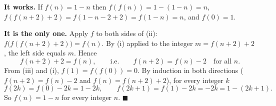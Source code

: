 \textbf{It works.} If $f(n)=1-n$ then $f(f(n))=1-(1-n)=n$, $f(f(n+2)+2)=f(1-n-2+2)=f(1-n)=n$, and $f(0)=1$.

\textbf{It is the only one.} Apply $f$ to both sides of (ii): $f\bigl(f(f(n+2)+2)\bigr)=f(n)$. By (i) applied to the integer $m=f(n+2)+2$, the left side equals $m$. Hence
\[f(n+2)+2=f(n),\qquad\text{i.e.}\qquad f(n+2)=f(n)-2\quad\text{for all }n.\]
From (iii) and (i), $f(1)=f(f(0))=0$. By induction in both directions ($f(n+2)=f(n)-2$ and $f(n)=f(n+2)+2$), for every integer $k$
\[f(2k)=f(0)-2k=1-2k,\qquad f(2k+1)=f(1)-2k=-2k=1-(2k+1).\]
So $f(n)=1-n$ for every integer $n$. $\blacksquare$
